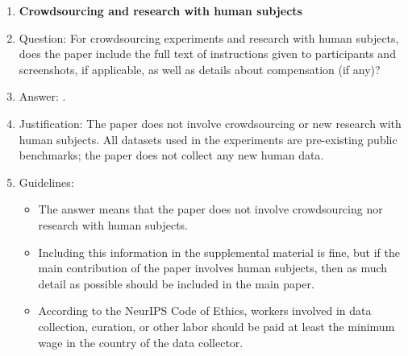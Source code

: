 \begin{enumerate}
\item {\bf Crowdsourcing and research with human subjects}
    \item[] Question: For crowdsourcing experiments and research with human subjects, does the paper include the full text of instructions given to participants and screenshots, if applicable, as well as details about compensation (if any)? 
    \item[] Answer: \answerNA{}.
    \item[] Justification: The paper does not involve crowdsourcing or new research with human subjects. All datasets used in the experiments are pre-existing public benchmarks; the paper does not collect any new human data.
    \item[] Guidelines:
    \begin{itemize}
        \item The answer \answerNA{} means that the paper does not involve crowdsourcing nor research with human subjects.
        \item Including this information in the supplemental material is fine, but if the main contribution of the paper involves human subjects, then as much detail as possible should be included in the main paper. 
        \item According to the NeurIPS Code of Ethics, workers involved in data collection, curation, or other labor should be paid at least the minimum wage in the country of the data collector. 
    \end{itemize}


\end{enumerate}
